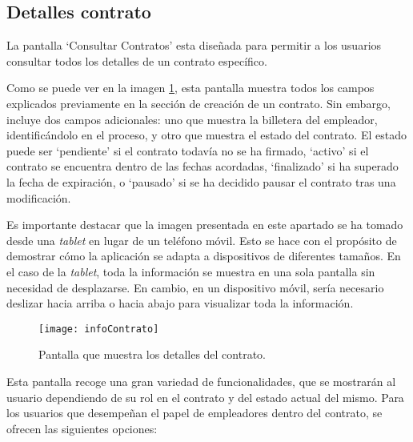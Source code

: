 \subsection{Detalles contrato}

La pantalla `Consultar Contratos' esta diseñada para permitir a los usuarios consultar todos los detalles de un contrato específico.

Como se puede ver en la imagen \ref{img:infoContrato}, esta pantalla muestra todos los campos explicados previamente en la sección de creación de un contrato. Sin embargo, incluye dos campos adicionales: uno que muestra la billetera del empleador, identificándolo en el proceso, y otro que muestra el estado del contrato. El estado puede ser `pendiente' si el contrato todavía no se ha firmado, `activo' si el contrato se encuentra dentro de las fechas acordadas, `finalizado' si ha superado la fecha de expiración, o `pausado' si se ha decidido pausar el contrato tras una modificación.

Es importante destacar que la imagen presentada en este apartado se ha tomado desde una \textit{tablet} en lugar de un teléfono móvil. Esto se hace con el propósito de demostrar cómo la aplicación se adapta a dispositivos de diferentes tamaños. En el caso de la \textit{tablet}, toda la información se muestra en una sola pantalla sin necesidad de desplazarse. En cambio, en un dispositivo móvil, sería necesario deslizar hacia arriba o hacia abajo para visualizar toda la información.

\begin{figure}[h]
	\label{img:infoContrato}
	\centering
	\texttt{[image: infoContrato]}
	\caption[Pantalla detalles del contrato]{Pantalla que muestra los detalles del contrato.}
\end{figure}

Esta pantalla recoge una gran variedad de funcionalidades, que se mostrarán al usuario dependiendo de su rol en el contrato y del estado actual del mismo.
Para los usuarios que desempeñan el papel de empleadores dentro del contrato, se ofrecen las siguientes opciones:

